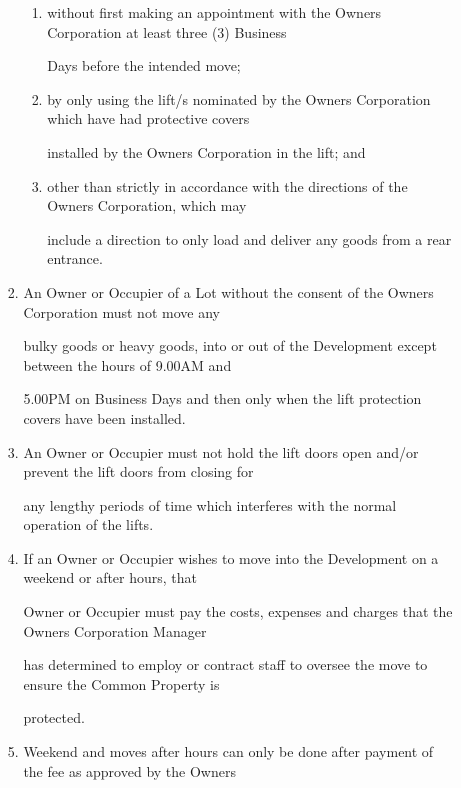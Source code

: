 \documentclass{article}
\begin{document}
\begin{enumerate}[label=\arabic*.]
\begin{enumerate}[label=\arabic{enumi}.\arabic*.]
\begin{enumerate}[label=(\arabic*)]
\begin{enumerate}[label=(\alph*)]
\item {\fontsize{9.962}{1} without first making an appointment with the Owners Corporation at least three (3) Business }

{\fontsize{10.02}{1}Days before the intended move; }

\item {\fontsize{9.962}{1} by only using the lift/s nominated by the Owners Corporation which have had protective covers }

{\fontsize{10.02}{1}installed by the Owners Corporation in the lift; and }

\item {\fontsize{9.962}{1} other than strictly in accordance with the directions of the Owners Corporation, which may }

{\fontsize{10.02}{1}include a direction to only load and deliver any goods from a rear entrance. }

\end{enumerate}
\item {\fontsize{9.962}{1} An Owner or Occupier of a Lot without the consent of the Owners Corporation must not move any }

{\fontsize{10.02}{1}bulky goods or heavy goods, into or out of the Development except between the hours of 9.00AM and }

{\fontsize{10.02}{1}5.00PM on Business Days and then only when the lift protection covers have been installed. }

\item {\fontsize{9.962}{1} An Owner or Occupier must not hold the lift doors open and/or prevent the lift doors from closing for }

{\fontsize{10.02}{1}any lengthy periods of time which interferes with the normal operation of the lifts. }

\item {\fontsize{9.962}{1} If an Owner or Occupier wishes to move into the Development on a weekend or after hours, that }

{\fontsize{10.02}{1}Owner or Occupier must pay the costs, expenses and charges that the Owners Corporation Manager }

{\fontsize{10.02}{1}has determined to employ or contract staff to oversee the move to ensure the Common Property is }

{\fontsize{10.02}{1}protected. }

\item {\fontsize{9.962}{1} Weekend and moves after hours can only be done after payment of the fee as approved by the Owners }


\end{enumerate}
\end{enumerate}
\end{enumerate}
\end{document}
